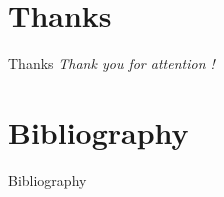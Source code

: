 \documentclass[pdflatex,compress,8pt,
	xcolor={dvipsnames,dvipsnames,svgnames,x11names,table},
	hyperref={colorlinks = true,breaklinks = true, urlcolor = NavyBlue, breaklinks = true}]{beamer}
\begin{document}
\section{Thanks}
\begin{frame}{Thanks}
  	\centering \LARGE 
  	\emph{Thank you for attention !}\\
\end{frame}


\section{Bibliography}
\Large{Bibliography}\ %
\nocite{*}
\printbibliography[heading=none]
\end{document}

